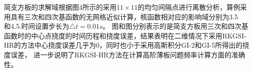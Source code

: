 \documentclass[11pt,a4paper]{article}
\begin{document}
\begin{figure}[!h]
\begin{floatrow}
\end{floatrow}
\end{figure}
简支方板的求解域根据图4所示的采用$11\times 11$的均匀间隔点进行离散分析，算例采用具有三次和四次基函数的无网格近似计算，核函数相对应的影响域分别为3.5\\和4.5.时间设置步长为$\triangle t=0.01s$。
图和图分别表示的是简支方板用三次和四次基函数时的中心点挠度的时间历程和挠度误差，结果表明在二维情况下采用RKGSI-HR的方法中心挠度误差几乎为0，同时也小于采用高斯积分GI-2和GI-5所得出的挠度误差，
进一步说明了RKGSI-HR方法在计算高阶薄板问题频率计算方面的准确性。
\end{document}
